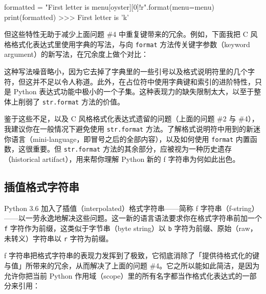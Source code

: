\begin{codebox}[python]
formatted = "First letter is {menu[oyster][0]!r}".format(menu=menu)
print(formatted)
>>>
First letter is 'k'
\end{codebox}

但这些特性无助于减少上面问题 \#4 中重复键带来的冗余。例如，下面我把 C 风格格式化表达式里使用字典的写法，与向 \texttt{format} 方法传关键字参数（keyword argument）的新写法，在冗余度上做个对比：


这种写法噪音略小，因为它去掉了字典里的一些引号以及格式说明符里的几个字符，但这并不足以令人称道。此外，在占位符中使用字典键和索引的进阶特性，只是 Python 表达式功能中极小的一个子集。这种表现力的缺失限制太大，以至于整体上削弱了 \texttt{str.format} 方法的价值。

鉴于这些不足，以及 C 风格格式化表达式遗留的问题（上面的问题 \#2 与 \#4），我建议你在一般情况下避免使用 \texttt{str.format} 方法。了解格式说明符中用到的新迷你语言（mini-language，即冒号之后的全部内容），以及如何使用 \texttt{format} 内置函数，这很重要。但 \texttt{str.format} 方法的其余部分，应被视为一种历史遗存（historical artifact），用来帮你理解 Python 新的 f 字符串为何如此出色。

\subsection{插值格式字符串}

Python 3.6 加入了插值（interpolated）格式字符串——简称 f 字符串（f-string）——以一劳永逸地解决这些问题。这一新的语言语法要求你在格式字符串前加一个 \texttt{f} 字符作为前缀，这类似于字节串（byte string）以 \texttt{b} 字符为前缀、原始（raw，未转义）字符串以 \texttt{r} 字符为前缀。

f 字符串把格式字符串的表现力发挥到了极致，它彻底消除了「提供待格式化的键与值」所带来的冗余，从而解决了上面的问题 \#4。它之所以能如此简洁，是因为允许你把当前 Python 作用域（scope）里的所有名字都当作格式化表达式的一部分来引用：

